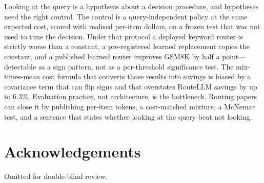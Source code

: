 \documentclass[a4paper,twoside]{article}
\begin{document}
Looking at the query is a hypothesis about a decision procedure, and hypotheses need the right control. The control is a query-independent policy at the same expected cost, scored with realised per-item dollars, on a frozen test that was not used to tune the decision. Under that protocol a deployed keyword router is strictly worse than a constant, a pre-registered learned replacement copies the constant, and a published learned router improves GSM8K by half a point---detectable as a sign pattern, not as a per-threshold significance test. The mix-times-mean cost formula that converts those results into savings is biased by a covariance term that can flip signs and that overstates RouteLLM savings by up to $6.3\%$. Evaluation practice, not architecture, is the bottleneck. Routing papers can close it by publishing per-item tokens, a cost-matched mixture, a McNemar test, and a sentence that states whether looking at the query beat not looking.

\section*{Acknowledgements}

Omitted for double-blind review.



\end{document}
